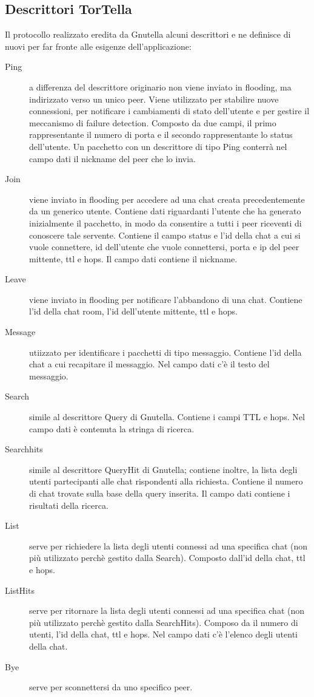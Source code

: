 \subsection{Descrittori TorTella}
Il protocollo realizzato eredita da Gnutella alcuni descrittori e ne definisce di nuovi per far fronte alle esigenze dell’applicazione:
\begin{description}
\item[Ping] a differenza del descrittore originario non viene inviato in flooding, ma indirizzato verso un unico peer. Viene utilizzato per stabilire nuove connessioni, per notificare i cambiamenti di stato dell'utente e per gestire il meccanismo di failure detection. Composto da due campi, il primo rappresentante il numero di porta e il secondo rappresentante lo status dell’utente. Un pacchetto con un descrittore di tipo Ping conterrà nel campo dati il nickname del peer che lo invia.
\item[Join] viene inviato in flooding per accedere ad una chat creata precedentemente da un generico utente. Contiene dati riguardanti l'utente che ha generato inizialmente il pacchetto, in modo da consentire a tutti i peer riceventi di conoscere tale servente. Contiene il campo status e l’id della chat a cui si vuole connettere, id dell'utente che vuole connettersi, porta e ip del peer mittente, ttl e hops. Il campo dati contiene il nickname.
\item[Leave] viene inviato in flooding per notificare l'abbandono di una chat. Contiene l’id della chat room, l'id dell'utente mittente, ttl e hops.
\item[Message] utiizzato per identificare i pacchetti di tipo messaggio. Contiene l’id della chat a cui recapitare il messaggio. Nel campo dati c'è il testo del messaggio.
\item[Search] simile al descrittore Query di Gnutella. Contiene i campi TTL e hops. Nel campo dati è contenuta la stringa di ricerca.
\item[Searchhits] simile al descrittore QueryHit di Gnutella; contiene inoltre, la lista degli utenti partecipanti alle chat rispondenti alla richiesta. Contiene il numero di chat trovate sulla base della query inserita. Il campo dati contiene i risultati della ricerca.
\item[List] serve per richiedere la lista degli utenti connessi ad una specifica chat (non più utilizzato perchè gestito dalla Search). Composto dall’id della chat, ttl e hops.
\item[ListHits] serve per ritornare la lista degli utenti connessi ad una specifica chat (non più utilizzato perchè gestito dalla SearchHits). Composo da il numero di utenti, l'id della chat, ttl e hops. Nel campo dati c'è l'elenco degli utenti della chat.
\item[Bye] serve per sconnettersi da uno specifico peer.
\end{description}
